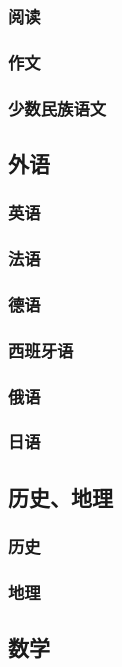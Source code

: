 \documentclass[UTF8]{../../ApplicationUniverse}
\begin{document}
        \subsubsection{阅读}
        \subsubsection{作文}
        \subsubsection{少数民族语文}
    \subsection{外语}
        \subsubsection{英语}
        \subsubsection{法语}
        \subsubsection{德语}
        \subsubsection{西班牙语}
        \subsubsection{俄语}
        \subsubsection{日语}
    \subsection{历史、地理}
        \subsubsection{历史}
        \subsubsection{地理}
    \subsection{数学}
\end{document}
